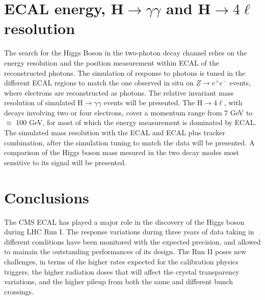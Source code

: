 \documentclass[11pt,twocolumn]{article}
\begin{document}
\section{ECAL energy, H$\to\gamma\gamma$ and H$\to4\ell$ resolution}
The search for the Higgs Boson in the two-photon decay channel relies
on the energy resolution and the position measurement within ECAL of
the reconstructed photons. The simulation of response to photons is
tuned in the different ECAL regions to match the one observed in situ
on $Z\to e^+e^-$ events, where electrons are reconstructed as photons.
The relative invariant mass resolution of simulated H$\to\gamma\gamma$
events will be presented.  The H$\to4\ell$, with decays involving two
or four electrons, cover a momentum range from 7 GeV to $\approx$ 100
GeV, for most of which the energy measurement is dominated by ECAL.
The simulated mass resolution with the ECAL and ECAL plus tracker
combination, after the simulation tuning to match the data will be
presented. A comparison of the Higgs boson mass mesured in the two
decay modes most sensitive to its signal will be presented.

\section{Conclusions}
The CMS ECAL has played a major role in the discovery of the Higgs
boson during LHC Run I. The response variations during three years of
data taking in different conditions have been monitored with the
expected precision, and allowed to mainain the outstanding
performances of its design. The Run II poses new challenges, in terms
of the higher rates expected for the calibration physics triggers, the
higher radiation doses that will affect the crystal transparency
variations, and the higher pileup from both the same and different
bunch crossings.
\end{document}
